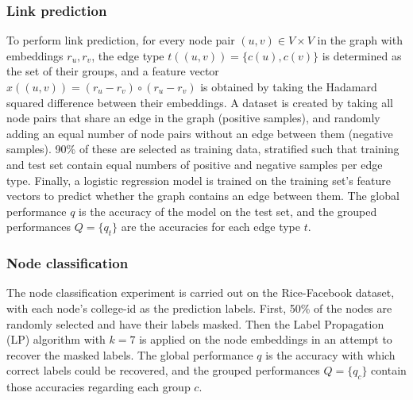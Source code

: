 \subsubsection*{Link prediction}
To perform link prediction, for every node pair $(u,v) \in V \times V$ in the graph with embeddings $r_u, r_v$, the edge type $t((u,v))=\{c(u), c(v)\}$ is determined as the set of their groups, and a feature vector $x((u,v))=(r_u - r_v) \circ (r_u - r_v)$ is obtained by taking the Hadamard squared difference between their embeddings.
A dataset is created by taking all node pairs that share an edge in the graph (positive samples), and randomly adding an equal number of node pairs without an edge between them (negative samples). 
90\% of these are selected as training data, stratified such that training and test set contain equal numbers of positive and negative samples per edge type.
Finally, a logistic regression model is trained on the training set's feature vectors to predict whether the graph contains an edge between them.
The global performance $q$ is the accuracy of the model on the test set, and the grouped performances $Q=\{q_t\}$ are the accuracies for each edge type $t$.


\subsubsection*{Node classification}
The node classification experiment is carried out on the Rice-Facebook dataset, with each node's college-id as the prediction labels.
First, 50\% of the nodes are randomly selected and have their labels masked.
Then the Label Propagation (LP) algorithm \cite{Zhu2002} with $k=7$ is applied on the node embeddings in an attempt to recover the masked labels.
The global performance $q$ is the accuracy with which correct labels could be recovered, and the grouped performances $Q=\{q_c\}$ contain those accuracies regarding each group $c$.

